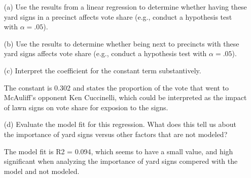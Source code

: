 \documentclass[12pt,letterpaper]{article}
\begin{document}
\vspace{.5cm}
\begin{enumerate}
	\item [(a)] Use the results from a linear regression to determine whether having these yard signs in a precinct affects vote share (e.g., conduct a hypothesis test with $\alpha = .05$).
	
  	

	\item [(b)]  Use the results to determine whether being
	next to precincts with these yard signs affects vote
	share (e.g., conduct a hypothesis test with $\alpha = .05$).
	
  	
	
	\vspace{1cm}
	\item [(c)] Interpret the coefficient for the constant term substantively.
	
The constant is 0.302 and states the proportion of the vote that went to McAuliff's opponent Ken Cuccinelli, which could be interpreted
as the impact of lawn signs on vote share for exposion to the signs. 
	
	\vspace{1cm}
	
	\item [(d)] Evaluate the model fit for this regression.  What does this	tell us about the importance of yard signs versus other factors that are not modeled?
	
The model fit is R2 = 0.094, which seems to have a small value,  and high significant when analyzing the importance of yard signs compered with the model and not modeled. 
	
\end{enumerate}  
\end{document}
